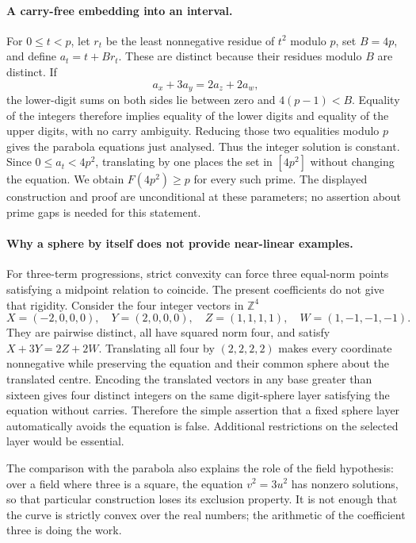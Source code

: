 \documentclass[11pt,a4paper]{article}
\newcommand{\Z}{\mathbb{Z}}
\begin{document}
\paragraph{A carry-free embedding into an interval.}
For $0\leq t<p$, let $r_t$ be the least nonnegative residue of $t^2$ modulo $p$, set $B=4p$, and define $a_t=t+Br_t$. These are distinct because their residues modulo $B$ are distinct. If
\[
 a_x+3a_y=2a_z+2a_w,
\]
the lower-digit sums on both sides lie between zero and $4(p-1)<B$. Equality of the integers therefore implies equality of the lower digits and equality of the upper digits, with no carry ambiguity. Reducing those two equalities modulo $p$ gives the parabola equations just analysed. Thus the integer solution is constant. Since $0\leq a_t<4p^2$, translating by one places the set in $[4p^2]$ without changing the equation. We obtain $F(4p^2)\geq p$ for every such prime. The displayed construction and proof are unconditional at these parameters; no assertion about prime gaps is needed for this statement.

\paragraph{Why a sphere by itself does not provide near-linear examples.}
For three-term progressions, strict convexity can force three equal-norm points satisfying a midpoint relation to coincide. The present coefficients do not give that rigidity. Consider the four integer vectors in $\Z^4$
\[
 X=(-2,0,0,0),\quad Y=(2,0,0,0),\quad
 Z=(1,1,1,1),\quad W=(1,-1,-1,-1).
\]
They are pairwise distinct, all have squared norm four, and satisfy $X+3Y=2Z+2W$. Translating all four by $(2,2,2,2)$ makes every coordinate nonnegative while preserving the equation and their common sphere about the translated centre. Encoding the translated vectors in any base greater than sixteen gives four distinct integers on the same digit-sphere layer satisfying the equation without carries. Therefore the simple assertion that a fixed sphere layer automatically avoids the equation is false. Additional restrictions on the selected layer would be essential.

The comparison with the parabola also explains the role of the field hypothesis: over a field where three is a square, the equation $v^2=3u^2$ has nonzero solutions, so that particular construction loses its exclusion property. It is not enough that the curve is strictly convex over the real numbers; the arithmetic of the coefficient three is doing the work.
\end{document}

